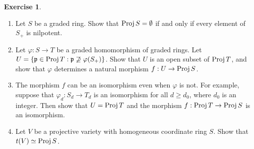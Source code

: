 \documentclass[]{pcmi}
\theoremstyle{plain}
\theoremstyle{definition}
\newtheorem{Exercise}[subsubsection]{Exercise}
\theoremstyle{remark}
\begin{document}
\begin{Exercise}
    \phantom{h}
    \begin{enumerate}[label = (\alph*)]
        \item Let $S$ be a graded ring. Show that $\operatorname{Proj} S = \emptyset$ if and only if every element of $S_+$ is nilpotent. 
        \item Let $\varphi : S \to T$ be a graded homomorphism of graded rings. Let $U = \{\mathfrak{p} \in \operatorname{Proj} T : \mathfrak{p} \not \supseteq \varphi(S_+)\}$. Show that $U$ is an open subset of $\operatorname{Proj} T$, and show that $\varphi$ determines a natural morphism $f : U \to \operatorname{Proj} S$.
        \item The morphism $f$ can be an isomorphism even when $\varphi$ is not. For example, suppose that $\varphi_d : S_d \to T_d$ is an isomorphism for all $d \geq d_0$, where $d_0$ is an integer. Then show that $U = \operatorname{Proj} T$ and the morphism $f : \operatorname{Proj} T \to \operatorname{Proj} S$ is an isomorphism. 
        \item Let $V$ be a projective variety with homogeneous coordinate ring $S$. Show that $t(V) \simeq \operatorname{Proj} S$. 
    \end{enumerate}
\end{Exercise}
\end{document}
